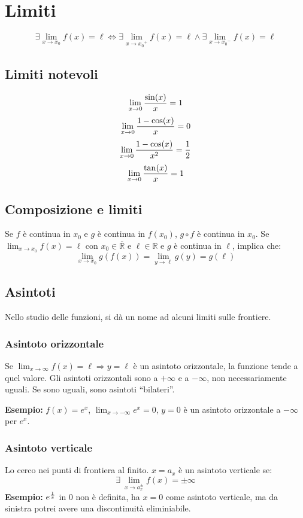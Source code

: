 \documentclass[12pt,a4paper]{article}
\begin{document}
\newpage
\section{Limiti}

$$ \exists \lim \limits_{x \to x_0} f(x) = \ell \Leftrightarrow
\exists \lim \limits_{x \to {x_0}^+} f(x) = \ell \land \exists
\lim \limits_{x \to {x_0}^-} f(x) = \ell $$

\subsection{Limiti notevoli}
$$ \lim_{x \to 0} {\sin(x) \over x} = 1 $$
$$ \lim_{x \to 0} {1 - \cos(x) \over x} = 0 $$
$$ \lim_{x \to 0} {1 - \cos(x) \over x^2} = {1 \over 2} $$
$$ \lim_{x \to 0} {\tan(x) \over x} = 1 $$

\subsection{Composizione e limiti}
Se $f$ \`e continua in $x_0$ e $g$ \`e continua in $f(x_0)$, 
$g \circ f$ \`e continua in $x_0$. Se $ \lim_{x \to x_0} f(x) =
\ell $ con $ x_0 \in \overline{\mathbb{R}} $ e $ \ell \in \mathbb{R} $ e
$ g $ \`e continua in $ \ell $, implica che:
$$ \lim_{x \to x_0} g(f(x)) = \lim_{y \to \ell} g(y) = g(\ell) $$

\subsection{Asintoti}
\label{asintoti}
Nello studio delle funzioni, si d\`a un nome ad alcuni limiti sulle
frontiere.

\subsubsection{Asintoto orizzontale}
Se $\lim_{x \to \infty} f(x) = \ell \Rightarrow y = \ell$ \`e un asintoto
orizzontale, la funzione tende a quel valore. Gli asintoti orizzontali
sono a $+\infty$ e a $-\infty$, non necessariamente uguali. Se sono uguali,
sono asintoti ``bilateri''.

\textbf{Esempio:} $f(x) = e^x$, $\lim_{x \to -\infty} e^x = 0$, $y = 0$ 
\`e un asintoto orizzontale a $-\infty$ per $e^x$.

\subsubsection{Asintoto verticale}
Lo cerco nei punti di frontiera al finito. $x = a_x$ \`e un asintoto
verticale se:
$$
\exists \ \lim_{x \to a_x^\pm} f(x) = \pm \infty
$$
\textbf{Esempio:} $e^{1 \over x}$ in $0$ non \`e definita, ha $x=0$ come 
asintoto verticale, ma da sinistra potrei avere una discontinuit\`a 
eliminiabile.
\end{document}
